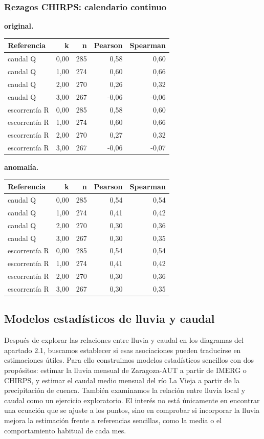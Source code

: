 \documentclass[10pt,a4paper]{article}
\begin{document}
\subsubsection*{Rezagos CHIRPS: calendario continuo}
\textbf{original.}\begin{center}\small\begin{tabular}{lrrrr}\hline
Referencia & k & n & Pearson & Spearman \\ \hline
caudal Q & 0,00 & 285 & 0,58 & 0,60 \\
caudal Q & 1,00 & 274 & 0,60 & 0,66 \\
caudal Q & 2,00 & 270 & 0,26 & 0,32 \\
caudal Q & 3,00 & 267 & -0,06 & -0,06 \\
escorrentía R & 0,00 & 285 & 0,58 & 0,60 \\
escorrentía R & 1,00 & 274 & 0,60 & 0,66 \\
escorrentía R & 2,00 & 270 & 0,27 & 0,32 \\
escorrentía R & 3,00 & 267 & -0,06 & -0,07 \\
\hline\end{tabular}\end{center}
\textbf{anomalía.}\begin{center}\small\begin{tabular}{lrrrr}\hline
Referencia & k & n & Pearson & Spearman \\ \hline
caudal Q & 0,00 & 285 & 0,54 & 0,54 \\
caudal Q & 1,00 & 274 & 0,41 & 0,42 \\
caudal Q & 2,00 & 270 & 0,30 & 0,36 \\
caudal Q & 3,00 & 267 & 0,30 & 0,35 \\
escorrentía R & 0,00 & 285 & 0,54 & 0,54 \\
escorrentía R & 1,00 & 274 & 0,41 & 0,42 \\
escorrentía R & 2,00 & 270 & 0,30 & 0,36 \\
escorrentía R & 3,00 & 267 & 0,30 & 0,35 \\
\hline\end{tabular}\end{center}

\subsection{Modelos estadísticos de lluvia y caudal}
Después de explorar las relaciones entre lluvia y caudal en los diagramas del apartado 2.1, buscamos establecer si esas asociaciones pueden traducirse en estimaciones útiles. Para ello construimos modelos estadísticos sencillos con dos propósitos: estimar la lluvia mensual de Zaragoza-AUT a partir de IMERG o CHIRPS, y estimar el caudal medio mensual del río La Vieja a partir de la precipitación de cuenca. También examinamos la relación entre lluvia local y caudal como un ejercicio exploratorio. El interés no está únicamente en encontrar una ecuación que se ajuste a los puntos, sino en comprobar si incorporar la lluvia mejora la estimación frente a referencias sencillas, como la media o el comportamiento habitual de cada mes.
\end{document}
